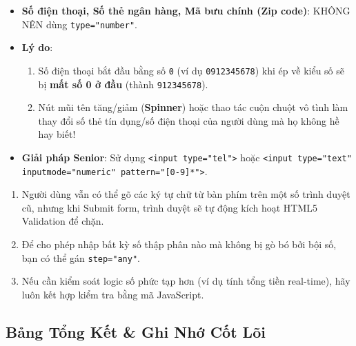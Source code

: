 \documentclass[11pt,oneside]{book}
\newcommand{\codeinline}[1]{\textcolor{accentOrange}{\texttt{#1}}}
\newcommand{\term}[1]{\textbf{\textcolor{primaryBlue}{#1}}}
\begin{document}
\begin{warnBox}[Bẫy UX Quan Trọng: Khi Nào KHÔNG NÊN Dùng input type="number"?]
\begin{itemize}[leftmargin=1.5em, itemsep=2pt, parsep=0pt]
    \item \textbf{Số điện thoại, Số thẻ ngân hàng, Mã bưu chính (Zip code)}: KHÔNG NÊN dùng \codeinline{type="number"}.
    \item \textbf{Lý do}:
      \begin{enumerate}[leftmargin=1.2em, itemsep=1pt]
        \item Số điện thoại bắt đầu bằng số \codeinline{0} (ví dụ \codeinline{0912345678}) khi ép về kiểu số sẽ bị \textbf{mất số 0 ở đầu} (thành \codeinline{912345678}).
        \item Nút mũi tên tăng/giảm (\term{Spinner}) hoặc thao tác cuộn chuột vô tình làm thay đổi số thẻ tín dụng/số điện thoại của người dùng mà họ không hề hay biết!
      \end{enumerate}
    \item \textbf{Giải pháp Senior}: Sử dụng \codeinline{<input type="tel">} hoặc \codeinline{<input type="text" inputmode="numeric" pattern="[0-9]*">}.
\end{itemize}
\end{warnBox}

\begin{tipBox}
\begin{enumerate}[leftmargin=1.5em, itemsep=2pt, parsep=0pt]
    \item Người dùng vẫn có thể gõ các ký tự chữ từ bàn phím trên một số trình duyệt cũ, nhưng khi Submit form, trình duyệt sẽ tự động kích hoạt HTML5 Validation để chặn.
    \item Để cho phép nhập bất kỳ số thập phân nào mà không bị gò bó bởi bội số, bạn có thể gán \codeinline{step="any"}.
    \item Nếu cần kiểm soát logic số phức tạp hơn (ví dụ tính tổng tiền real-time), hãy luôn kết hợp kiểm tra bằng mã JavaScript.
\end{enumerate}
\end{tipBox}

\subsection{Bảng Tổng Kết \& Ghi Nhớ Cốt Lõi}
\end{document}
